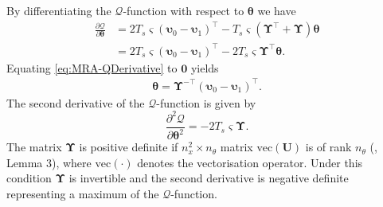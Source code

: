 \documentclass[11pt,draftcls,onecolumn,peerreview]{IEEEtran}
\begin{document}
By differentiating the $\mathcal Q$-function with respect to $\boldsymbol\theta$ we have
\begin{align}\label{eq:MRA-QDerivative}
\frac{\partial \mathcal Q}{\partial \boldsymbol\theta}&=2T_s\varsigma(\boldsymbol\upsilon_0-\boldsymbol\upsilon_1)^\top-T_s\varsigma(\boldsymbol\Upsilon^\top+\boldsymbol\Upsilon)\boldsymbol\theta \nonumber \\
&=2T_s\varsigma(\boldsymbol\upsilon_0-\boldsymbol\upsilon_1)^\top-2T_s\varsigma\boldsymbol\Upsilon^\top\boldsymbol\theta.
\end{align}
Equating \eqref{eq:MRA-QDerivative} to $\mathbf 0$ yields
\begin{align}\label{eq:MRA-thetahat}
\boldsymbol \theta= \boldsymbol\Upsilon^{-\top}(\boldsymbol\upsilon_0-\boldsymbol\upsilon_1)^\top.
\end{align}
The second derivative of the $\mathcal Q$-function is given by
\begin{equation}
\frac{\partial^2\mathcal Q}{\partial\boldsymbol\theta^2}=-2T_s\varsigma\boldsymbol\Upsilon.
\end{equation}
The matrix $\boldsymbol\Upsilon$ is positive definite if $n_x^2\times n_{\theta}$ matrix $\mathrm{vec}(\mathbf U)$ is of rank $n_{\theta}$ (\cite{Dewar2009}, Lemma 3), where $\mathrm{vec}(\cdot)$ denotes the vectorisation operator. Under this condition $\boldsymbol\Upsilon$ is  invertible and the second derivative is negative definite representing a maximum of the $\mathcal Q$-function. 
\end{document}
